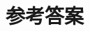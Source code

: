\documentclass[b5paper]{ctexart}
\begin{document}
\ifx\wholebook\relax \else
\section{参考答案}
\shipoutAnswer

\begin{thebibliography}{99}




\end{thebibliography}

\expandafter\enddocument

\fi
\end{document}
